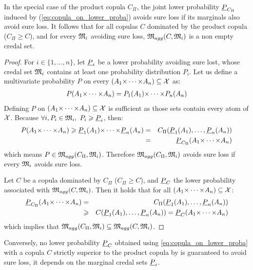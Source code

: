 In the special case of the product copula $C_\Pi$, the joint lower probability ${\underline{P}}_{C_\Pi}$ induced by (\ref{eq:copula_on_lower_proba}) avoids sure loss if its marginals also avoid sure loss. It follows that for all copulas $C$ dominated by the product copula (\ie $C_\Pi\geqslant C$), and for every ${\mathfrak{M}}_i$ avoiding sure loss, ${\mathfrak{M}}_{agg}(C, {\mathfrak{M}}_i)$ is a non empty credal set.
\begin{proof}
    For $i\in\{1,\dots,n\}$, let ${\underline{P}}_i$ be a lower probability avoiding sure lost, \ie whose credal set ${\mathfrak{M}}_i$ contains at least one probability distribution $P_i$. Let us define a multivariate probability $P$ on every $(A_1{\times\dots\times} A_n)\subseteq{\mathcal{X}}$ as:
    \begin{eqnarray*}
        P(A_1{\times\dots\times} A_n) = P_1(A_1){\times\dots\times} P_n(A_n)
    \end{eqnarray*}
    Defining $P$ on $(A_1{\times\dots\times} A_n)\subseteq{\mathcal{X}}$ is sufficient as those sets contain every atom of ${\mathcal{X}}$.
    Because $\forall i, P_i\in{\mathfrak{M}}_i,~P_i\geqslant {\underline{P}}_i$, then:
    \begin{eqnarray*}
        P(A_1{\times\dots\times} A_n) \geqslant {\underline{P}}_1(A_1){\times\dots\times} {\underline{P}}_n(A_n) &=& C_\Pi({\underline{P}}_1(A_1), \dots, {\underline{P}}_n(A_n))\\
        &=& {\underline{P}}_{C_\Pi}(A_1{\times\dots\times} A_n)
    \end{eqnarray*}
which means $P\in{\mathfrak{M}}_{agg}(C_\Pi, {\mathfrak{M}}_i)$. Therefore ${\mathfrak{M}}_{agg}(C_\Pi, {\mathfrak{M}}_i)$ avoids sure loss if every ${\mathfrak{M}}_i$ avoids sure loss.

Let $C$ be a copula dominated by $C_\Pi$ (\ie $C_\Pi\geqslant C$), and ${\underline{P}}_C$ the lower probability associated with ${\mathfrak{M}}_{agg}(C, {\mathfrak{M}}_i)$. Then it holds that for all $(A_1{\times\dots\times} A_n)\subseteq{\mathcal{X}}$:
\begin{eqnarray*}
{\underline{P}}_{C_\Pi}(A_1{\times\dots\times} A_n)&=&C_\Pi({\underline{P}}_1(A_1), \dots, {\underline{P}}_n(A_n)) \\
    &\geqslant& C({\underline{P}}_1(A_1),\dots, {\underline{P}}_n(A_n)) = {\underline{P}}_C(A_1{\times\dots\times} A_n)
\end{eqnarray*}
which implies that ${\mathfrak{M}}_{agg}(C_\Pi, {\mathfrak{M}}_i)\subseteq {\mathfrak{M}}_{agg}(C, {\mathfrak{M}}_i)$.
\end{proof}

Conversely, no lower probability ${\underline{P}}_C$ obtained using \ref{eq:copula_on_lower_proba} with a copula $C$ strictly superior to the product copula by is guaranteed to avoid sure loss, it depends on the marginal credal sets ${\underline{P}}_i$.

